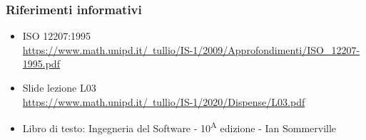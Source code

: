 \subsubsection{Riferimenti informativi}
\begin{itemize}
    \item ISO 12207:1995\\ 
    \href{https://www.math.unipd.it/~tullio/IS-1/2009/Approfondimenti/ISO\_12207-1995.pdf}{https://www.math.unipd.it/~tullio/IS-1/2009/Approfondimenti/ISO\_12207-1995.pdf}
    \item Slide lezione L03\\ \href{https://www.math.unipd.it/~tullio/IS-1/2020/Dispense/L03.pdf}{https://www.math.unipd.it/~tullio/IS-1/2020/Dispense/L03.pdf}
    \item Libro di testo: Ingegneria del Software - 10\textsuperscript{A} edizione - Ian Sommerville
\end{itemize}
